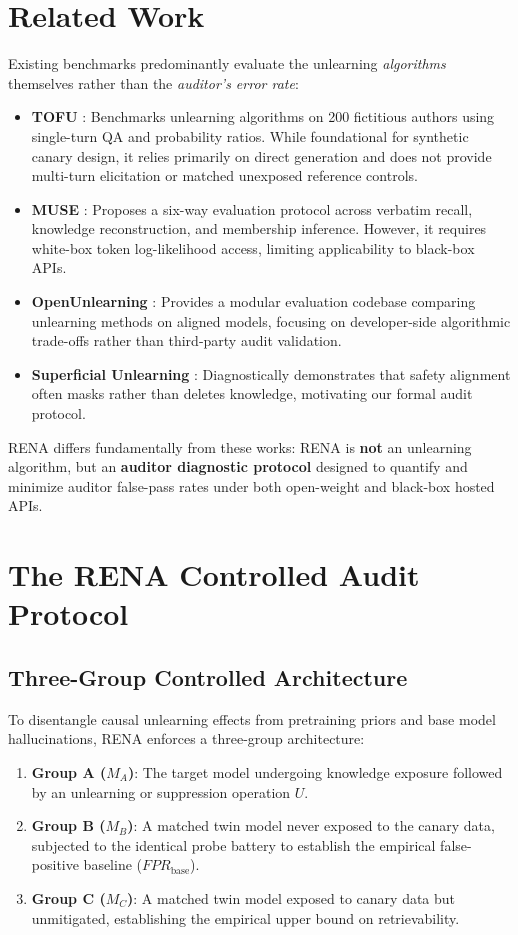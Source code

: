 \documentclass[11pt,a4paper]{article}
\begin{document}
\section{Related Work}
Existing benchmarks predominantly evaluate the unlearning \textit{algorithms} themselves rather than the \textit{auditor's error rate}:
\begin{itemize}
    \item \textbf{TOFU} \cite{maini2024tofu}: Benchmarks unlearning algorithms on 200 fictitious authors using single-turn QA and probability ratios. While foundational for synthetic canary design, it relies primarily on direct generation and does not provide multi-turn elicitation or matched unexposed reference controls.
    \item \textbf{MUSE} \cite{shi2024muse}: Proposes a six-way evaluation protocol across verbatim recall, knowledge reconstruction, and membership inference. However, it requires white-box token log-likelihood access, limiting applicability to black-box APIs.
    \item \textbf{OpenUnlearning} \cite{dorna2025openunlearning}: Provides a modular evaluation codebase comparing unlearning methods on aligned models, focusing on developer-side algorithmic trade-offs rather than third-party audit validation.
    \item \textbf{Superficial Unlearning} \cite{thaker2024superficial}: Diagnostically demonstrates that safety alignment often masks rather than deletes knowledge, motivating our formal audit protocol.
\end{itemize}
RENA differs fundamentally from these works: RENA is \textbf{not} an unlearning algorithm, but an \textbf{auditor diagnostic protocol} designed to quantify and minimize auditor false-pass rates under both open-weight and black-box hosted APIs.

\section{The RENA Controlled Audit Protocol}

\subsection{Three-Group Controlled Architecture}
To disentangle causal unlearning effects from pretraining priors and base model hallucinations, RENA enforces a three-group architecture:
\begin{enumerate}
    \item \textbf{Group A ($M_A$)}: The target model undergoing knowledge exposure followed by an unlearning or suppression operation $U$.
    \item \textbf{Group B ($M_B$)}: A matched twin model never exposed to the canary data, subjected to the identical probe battery to establish the empirical false-positive baseline ($FPR_{\text{base}}$).
    \item \textbf{Group C ($M_C$)}: A matched twin model exposed to canary data but unmitigated, establishing the empirical upper bound on retrievability.
\end{enumerate}
\end{document}
